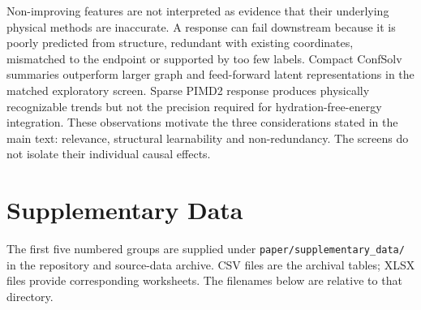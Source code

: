 Non-improving features are not interpreted as evidence that their underlying
physical methods are inaccurate. A response can fail downstream because it is
poorly predicted from structure, redundant with existing coordinates, mismatched to
the endpoint or supported by too few labels. Compact ConfSolv summaries outperform
larger graph and feed-forward latent representations in the matched exploratory
screen. Sparse PIMD2 response produces physically recognizable trends but not the
precision required for hydration-free-energy integration. These observations
motivate the three considerations stated in the main text: relevance, structural
learnability and non-redundancy. The screens do not isolate their individual causal effects.

\clearpage
\section*{Supplementary Data}

The first five numbered groups are supplied under \nolinkurl{paper/supplementary_data/}
in the repository and source-data archive. CSV files are the archival tables;
XLSX files provide corresponding worksheets. The filenames below are relative to
that directory.

